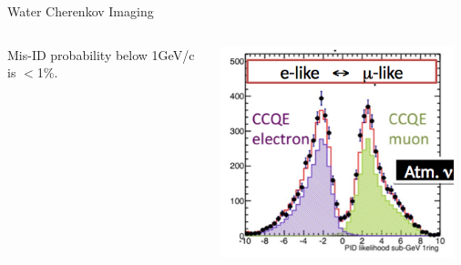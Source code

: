 \begin{frame}{Water Cherenkov Imaging}
\begin{columns}
\begin{column}{0.65\textwidth}
    \vspace{0.2cm}
    Mis-ID probability below 1GeV/c is $<$1\%.
  \end{column}
  \begin{column}{0.35\textwidth}
    \includegraphics[width=0.95\textwidth]{./images/3nu/atmo/sk_pid.png}\\
  \end{column}
\end{columns}
\end{frame}


